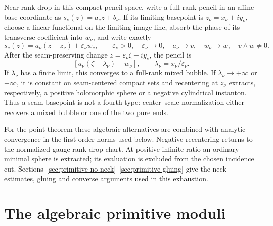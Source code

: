 \documentclass[11pt]{amsart}
\theoremstyle{definition}
\theoremstyle{remark}
\theoremstyle{plain}
\begin{document}
Near rank drop in this compact pencil space, write a full-rank
pencil in an affine base coordinate as
$s_\nu(z)=a_\nu z+b_\nu$.  If its limiting basepoint is
$z_\nu=x_\nu+iy_\nu$, choose a linear functional on the limiting image
line, absorb the phase of its transverse coefficient into $w_\nu$, and
write exactly
\begin{equation}\label{eq:rank-drop-exact-normal-form}
 s_\nu(z)=a_\nu(z-z_\nu)+\varepsilon_\nu w_\nu,
 \qquad \varepsilon_\nu>0,\quad \varepsilon_\nu\to0,\quad
 a_\nu\to v,\quad w_\nu\to w,\quad v\wedge w\ne0.
\end{equation}
After the seam-preserving change
$z=\varepsilon_\nu\zeta+iy_\nu$, the pencil is
\[
 [a_\nu(\zeta-\lambda_\nu)+w_\nu],
 \qquad \lambda_\nu=x_\nu/\varepsilon_\nu.
\]
If $\lambda_\nu$ has a finite limit, this converges to a full-rank mixed
bubble.  If $\lambda_\nu\to+\infty$ or $-\infty$, it is constant on
seam-centered compact sets and recentering at $z_\nu$ extracts,
respectively, a positive holomorphic sphere or a negative cylindrical
instanton.  Thus a seam basepoint is not a fourth type: center--scale
normalization either recovers a mixed bubble or one of the two pure ends.

For the point theorem these algebraic alternatives
are combined with analytic convergence in the
first-order norms used below. Negative recentering
returns to the normalized gauge rank-drop chart.
At positive infinite ratio an ordinary minimal
sphere is extracted; its evaluation is excluded
from the chosen incidence cut.
Sections~\ref{sec:primitive-no-neck}--\ref{sec:primitive-gluing}
give the neck estimates, gluing and converse
arguments used in this exhaustion.

\section{The algebraic primitive moduli}
\label{sec:primitive-algebraic}
\end{document}
